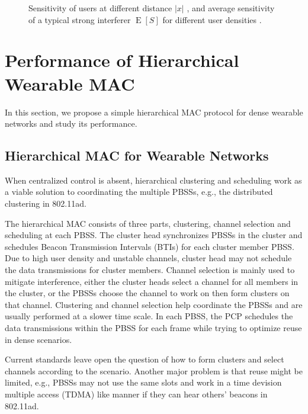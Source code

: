 \documentclass[10pt, conference, letterpaper]{IEEEtran}
\DeclareMathOperator*{\E}{\mathrm{E}}
\begin{document}
\begin{figure}
	\centering
	 \hfill
	
	\caption[]{Sensitivity of users at different distance $|x|$ , and average sensitivity of a typical strong interferer $\E[S]$ for different user densities .}
	\label{fig:channel:sensitivity}
\end{figure}




\section{Performance of Hierarchical Wearable MAC}\label{section:clustering}
In this section, we propose a simple hierarchical MAC protocol for dense wearable networks and study its performance.


\subsection{Hierarchical MAC for Wearable Networks}\label{section:clustering:hierarchy}
When centralized control is absent, hierarchical clustering and scheduling work as a viable solution to coordinating the multiple PBSSs, e.g., the distributed clustering in 802.11ad. 


The hierarchical MAC consists of three parts, clustering, channel selection and scheduling at each PBSS. 
The cluster head synchronizes PBSSs in the cluster and schedules Beacon Transmission Intervals (BTIs) for each cluster member PBSS. 
Due to high user density and unstable channels, cluster head may not schedule the data transmissions for cluster members.
Channel selection is mainly used to mitigate interference, either the cluster heads select a channel for all members in the cluster, or the PBSSs choose the channel to work on then form clusters on that channel. 
Clustering and channel selection help coordinate the PBSSs and are usually performed at a slower time scale. 
In each PBSS, the PCP schedules the data transmissions within the PBSS for each frame while trying to optimize reuse in dense scenarios. 


Current standards leave open the question of how to form clusters and select channels according to the scenario. 
Another major problem is that reuse might be limited, e.g., PBSSs may not use the same slots and work in a time devision multiple access (TDMA) like manner if they can hear others' beacons in 802.11ad.
\end{document}
